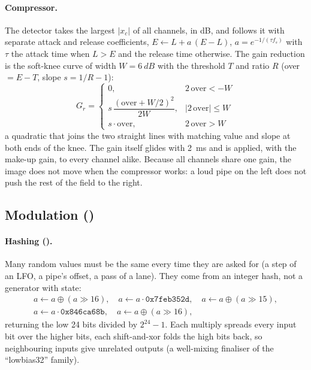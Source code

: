 \paragraph{Compressor.} The detector takes the largest $|x_c|$ of all channels, in dB, and follows it with separate
attack and release coefficients, $E \leftarrow L + a\,(E - L)$, $a = e^{-1/(\tau f_s)}$ with $\tau$ the attack time when
$L > E$ and the release time otherwise. The gain reduction is the soft-knee curve of width $W = \SI{6}{dB}$ with the
threshold $T$ and ratio $R$ (over $= E - T$, slope $s = 1/R - 1$):
\begin{equation}
  G_r = \begin{cases} 0, & 2\,\text{over} < -W\\[2pt] s\,\dfrac{(\text{over} + W/2)^2}{2W}, & |2\,\text{over}|\le W\\[6pt]
  s\cdot\text{over}, & 2\,\text{over} > W\end{cases}
\end{equation}
a quadratic that joins the two straight lines with matching value and slope at both ends of the knee. The gain itself
glides with \SI{2}{ms} and is applied, with the make-up gain, to every channel alike. Because all channels share
one gain, the image does not move when the compressor works: a loud pipe on the left does not push the rest of the
field to the right.

\subsection{Modulation ()}
\label{sec:math-mod}
\paragraph{Hashing ().} Many random values must be the same every time they are asked for (a step of an
LFO, a pipe's offset, a pass of a lane). They come from an integer hash, not a generator with state:
\begin{gather}
  a \leftarrow a\oplus(a\gg16),\quad a \leftarrow a\cdot\mathtt{0x7feb352d},\quad a \leftarrow a\oplus(a\gg15),\\
  a \leftarrow a\cdot\mathtt{0x846ca68b},\quad a \leftarrow a\oplus(a\gg16),
\end{gather}
returning the low 24 bits divided by $2^{24}-1$. Each multiply spreads every input bit over the higher bits, each
shift-and-xor folds the high bits back, so neighbouring inputs give unrelated outputs (a well-mixing finaliser of the
\enquote{lowbias32} family).

